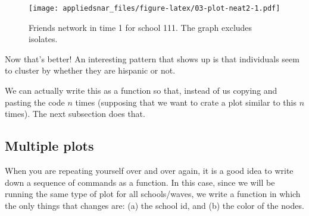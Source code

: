 \documentclass[]{book}
\newenvironment{Shaded}{\begin{snugshade}}{\end{snugshade}}
\newcommand{\KeywordTok}[1]{\textcolor[rgb]{0.13,0.29,0.53}{\textbf{#1}}}
\newcommand{\DataTypeTok}[1]{\textcolor[rgb]{0.13,0.29,0.53}{#1}}
\newcommand{\DecValTok}[1]{\textcolor[rgb]{0.00,0.00,0.81}{#1}}
\newcommand{\StringTok}[1]{\textcolor[rgb]{0.31,0.60,0.02}{#1}}
\newcommand{\CommentTok}[1]{\textcolor[rgb]{0.56,0.35,0.01}{\textit{#1}}}
\newcommand{\OtherTok}[1]{\textcolor[rgb]{0.56,0.35,0.01}{#1}}
\newcommand{\ControlFlowTok}[1]{\textcolor[rgb]{0.13,0.29,0.53}{\textbf{#1}}}
\newcommand{\OperatorTok}[1]{\textcolor[rgb]{0.81,0.36,0.00}{\textbf{#1}}}
\newcommand{\NormalTok}[1]{#1}
\theoremstyle{definition}
\theoremstyle{definition}
\theoremstyle{definition}
\theoremstyle{remark}
\begin{document}
\begin{figure}
\centering
\texttt{[image: appliedsnar\_files/figure-latex/03-plot-neat2-1.pdf]}
\caption{\label{fig:03-plot-neat2}Friends network in time 1 for school 111.
The graph excludes isolates.}
\end{figure}

Now that's better! An interesting pattern that shows up is that
individuals seem to cluster by whether they are hispanic or not.

We can actually write this as a function so that, instead of us copying
and pasting the code \(n\) times (supposing that we want to crate a plot
similar to this \(n\) times). The next subsection does that.

\subsection{Multiple plots}\label{multiple-plots}

When you are repeating yourself over and over again, it is a good idea
to write down a sequence of commands as a function. In this case, since
we will be running the same type of plot for all schools/waves, we write
a function in which the only things that changes are: (a) the school id,
and (b) the color of the nodes.

\begin{Shaded}
\end{Shaded}
\end{document}
